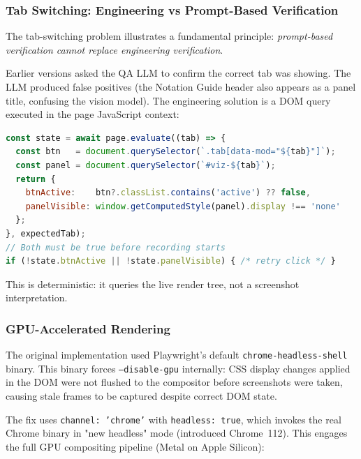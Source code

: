 \documentclass[12pt,a4paper]{article}
\begin{document}
\subsubsection{Tab Switching: Engineering vs Prompt-Based Verification}

The tab-switching problem illustrates a fundamental principle: \emph{prompt-based
verification cannot replace engineering verification}.

Earlier versions asked the QA LLM to confirm the correct tab was showing. The LLM
produced false positives (the Notation Guide header also appears as a panel title,
confusing the vision model). The engineering solution is a DOM query executed in
the page JavaScript context:

\begin{lstlisting}[language=JavaScript, caption=DOM-verified tab check]
const state = await page.evaluate((tab) => {
  const btn   = document.querySelector(`.tab[data-mod="${tab}"]`);
  const panel = document.querySelector(`#viz-${tab}`);
  return {
    btnActive:    btn?.classList.contains('active') ?? false,
    panelVisible: window.getComputedStyle(panel).display !== 'none'
  };
}, expectedTab);
// Both must be true before recording starts
if (!state.btnActive || !state.panelVisible) { /* retry click */ }
\end{lstlisting}

This is deterministic: it queries the live render tree, not a screenshot
interpretation.

\subsubsection{GPU-Accelerated Rendering}

The original implementation used Playwright's default \texttt{chrome-headless-shell}
binary. This binary forces \texttt{--disable-gpu} internally: CSS display changes
applied in the DOM were not flushed to the compositor before screenshots were
taken, causing stale frames to be captured despite correct DOM state.

The fix uses \texttt{channel: 'chrome'} with \texttt{headless: true}, which
invokes the real Chrome binary in "new headless" mode (introduced Chrome~112).
This engages the full GPU compositing pipeline (Metal on Apple Silicon):
\end{document}
